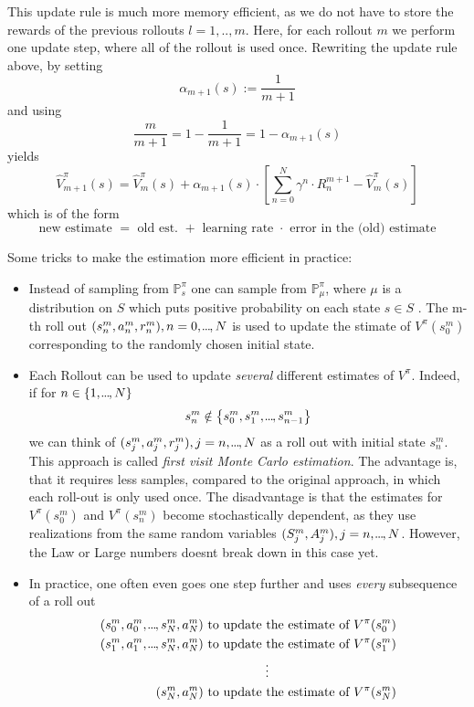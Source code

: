 This update rule is much more memory efficient, as we do not have to store the rewards of the previous rollouts \( l = 1,..,m \). Here, for each rollout \( m \) we perform one update step, where all of the rollout is used once.
Rewriting the update rule above, by setting
\[
    \alpha_{m+1}(s) := \frac{1}{m+1}
\]
and using 
\[
    \frac{m}{m+1} = 1 - \frac{1}{m+1} = 1 - \alpha_{m+1}(s)
\] 
yields 
\[
    \hat{V}_{m+1}^\pi(s) = \hat{V}_m^\pi(s) + \alpha_{m+1}(s) \cdot \left[ \sum_{n=0}^N \gamma^n \cdot R_n^{m+1} - \hat{V}_m^\pi(s) \right]
\]
which is of the form
\[
    \text{ new estimate } = \text{ old est. } + \text{ learning rate } \cdot \text{ error in the (old) estimate }
\] 
 
Some tricks to make the estimation more efficient in practice:
\begin{itemize}
    \item Instead of sampling from \( \mathbb{P}_s^\pi \) one can sample from \( \mathbb{P}_\mu^\pi \), where \( \mu \) is a distribution on \( S \) which puts positive probability on each state \( s \in S \) . The m-th roll out \( (s_n^m, a_n^m, r_n^m), n=0,\kern-0.10em.\kern-0.06em.\kern-0.06em.\kern-0.1em,N \) is used to update the stimate of \( V^\pi(s_{0}^m) \) corresponding to the randomly chosen initial state.
    
    \item Each Rollout can be used to update \emph{several} different estimates of \( V^\pi \). Indeed, if for \( n \in \left\{ 1,\kern-0.10em.\kern-0.06em.\kern-0.06em.\kern-0.1em,N \right\} \)
    \[
        s_n^m \notin \left\{ s_{0}^m, s_{1}^m, \kern-0.10em.\kern-0.06em.\kern-0.06em.\kern-0.1em, s_{n-1}^m \right\}
    \]
    we can think of \( (s_j^m, a_j^m, r_j^m), j=n,\kern-0.10em.\kern-0.06em.\kern-0.06em.\kern-0.1em,N \) as a roll out with initial state \( s_n^m  \). This approach is called \emph{first visit Monte Carlo estimation}.
    The advantage is, that it requires less samples, compared to the original approach, in which each roll-out is only used once.
    The disadvantage is that the estimates for \( V^\pi(s_{0}^m) \) and \( V^\pi(s_n^m) \) become stochastically dependent, as they use realizations from the same random variables \( (S_j^m, A_j^m), j = n,\kern-0.10em.\kern-0.06em.\kern-0.06em.\kern-0.1em,N \). However, the Law or Large numbers doesnt break down in this case yet.
    
    \item In practice, one often even goes one step further and uses \emph{every} subsequence of a roll out 
    \begin{align*}
        (s_{0}^m, a_{0}^m, \kern-0.10em.\kern-0.06em.\kern-0.06em.\kern-0.1em, s_N^m, a_N^m) \text{ to update the estimate of } V^\pi(s_{0}^m) \\
        (s_{1}^m, a_{1}^m, \kern-0.10em.\kern-0.06em.\kern-0.06em.\kern-0.1em, s_N^m, a_N^m) \text{ to update the estimate of } V^\pi(s_{1}^m) \\
        \vdots\qquad \qquad \qquad \qquad \qquad  \\
        (s_{N}^m, a_{N}^m) \text{ to update the estimate of } V^\pi(s_{N}^m) \\
    \end{align*}
\end{itemize}
 
